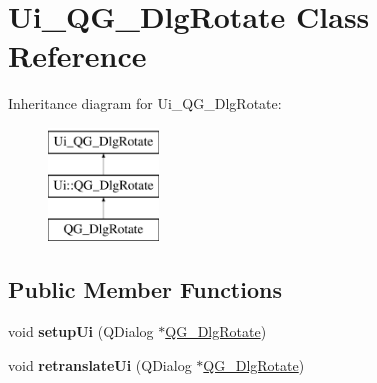 \hypertarget{classUi__QG__DlgRotate}{\section{Ui\-\_\-\-Q\-G\-\_\-\-Dlg\-Rotate Class Reference}
\label{classUi__QG__DlgRotate}
}
Inheritance diagram for Ui\-\_\-\-Q\-G\-\_\-\-Dlg\-Rotate\-:\begin{figure}[H]
\begin{center}
\leavevmode
\includegraphics[height=3.000000cm]{classUi__QG__DlgRotate}
\end{center}
\end{figure}
\subsection*{Public Member Functions}
\begin{DoxyCompactItemize}
\item 
\hypertarget{classUi__QG__DlgRotate_a39b07486e21de9f6835c71fd46fda8a3}{void {\bfseries setup\-Ui} (Q\-Dialog $\ast$\hyperlink{classQG__DlgRotate}{Q\-G\-\_\-\-Dlg\-Rotate})}\label{classUi__QG__DlgRotate_a39b07486e21de9f6835c71fd46fda8a3}

\item 
\hypertarget{classUi__QG__DlgRotate_a1db98c6bad468e7ce4eb278714fdebdb}{void {\bfseries retranslate\-Ui} (Q\-Dialog $\ast$\hyperlink{classQG__DlgRotate}{Q\-G\-\_\-\-Dlg\-Rotate})}\label{classUi__QG__DlgRotate_a1db98c6bad468e7ce4eb278714fdebdb}

\end{DoxyCompactItemize}
